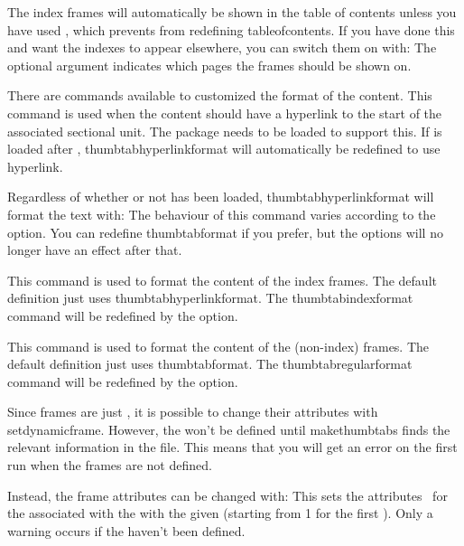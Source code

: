 \documentclass[fontsize=12pt]{scrbook}
\begin{document}
The  index frames will automatically be shown in the
table of contents unless you have used
, which prevents  from
redefining \gls{tableofcontents}. If you have done this and want the
 indexes to appear elsewhere, you can switch them on
with:
The optional argument  indicates which pages the
 frames should be shown on.

There are commands available to customized the format of the
 content.
This command is used when the content should have a hyperlink to the
start of the associated sectional unit. The  package
needs to be loaded to support this. If  is loaded
after , \gls{thumbtabhyperlinkformat} will
automatically be redefined to use \gls{hyperlink}.

Regardless of whether or not  has been loaded, 
\gls{thumbtabhyperlinkformat} will format the text with:
The behaviour of this command varies according to the
 option. You can redefine \gls{thumbtabformat} if
you prefer, but the  options will no longer have
an effect after that.

This command is used to format the content of the 
index frames. The default definition just uses
\gls{thumbtabhyperlinkformat}. The \gls{thumbtabindexformat}
command will be redefined by the  option.

This command is used to format the content of the 
(non-index) frames. The default definition just uses
\gls{thumbtabformat}. The \gls{thumbtabregularformat}
command will be redefined by the  option.

Since  frames are just , it is
possible to change their attributes with \gls{setdynamicframe}.
However, the  won't be defined until 
\gls{makethumbtabs} finds the relevant information in the 
file. This means that you will get an error on the first run when
the frames are not defined.

Instead, the  frame attributes can be changed with:
This sets the attributes \keyvallist\ for the 
associated with the  with the given  (starting
from 1 for the first ). Only a warning occurs if the
 haven't been defined.
\end{document}
